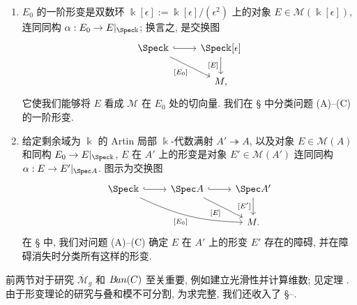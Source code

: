 \begin{enumerate}[(1)]
\item $E_0$ 的一阶形变是双数环 $\Bbbk[\epsilon]:=\Bbbk[\epsilon]/(\epsilon^2)$ 上的对象 $E\in\mathcal M(\Bbbk[\epsilon])$, 连同同构 $\alpha:E_0\to E|_{\Spec\Bbbk}$; 换言之, 是交换图
\[
\begin{tikzcd}
\Spec\Bbbk\arrow[r,hook]\arrow[dr,"{[E_0]}"']&\Spec\Bbbk[\epsilon]\arrow[d,"{[E]}"']\\
&\mathcal M,
\end{tikzcd}
\]
它使我们能够将 $E$ 看成 $\mathcal M$ 在 $E_0$ 处的切向量. 我们在 \S{} 中分类问题 (A)--(C) 的一阶形变.
\item 给定剩余域为 $\Bbbk$ 的 Artin 局部 $\Bbbk$-代数满射 $A'\twoheadrightarrow A$, 以及对象 $E\in\mathcal M(A)$ 和同构 $E_0\to E|_{\Spec\Bbbk}$, $E$ 在 $A'$ 上的形变是对象 $E'\in\mathcal M(A')$ 连同同构 $\alpha:E\to E'|_{\Spec A}$. 图示为交换图
\[
\begin{tikzcd}
\Spec\Bbbk\arrow[r,hook]\arrow[drr,"{[E_0]}"',bend right=12]&\Spec A\arrow[r,hook]\arrow[dr,"{[E]}"']&\Spec A'\arrow[d,"{[E']}"']\\
&&\mathcal M.
\end{tikzcd}
\]
在 \S{} 中, 我们对问题 (A)--(C) 确定 $E$ 在 $A'$ 上的形变 $E'$ 存在的障碍, 并在障碍消失时分类所有这样的形变.
\end{enumerate}
前两节对于研究 $\overline{\mathcal M}_g$ 和 $B\!un(C)$ 至关重要, 例如建立光滑性并计算维数; 见定理 . 由于形变理论的研究与叠和模不可分割, 为求完整, 我们还收入了 \S{}--.
